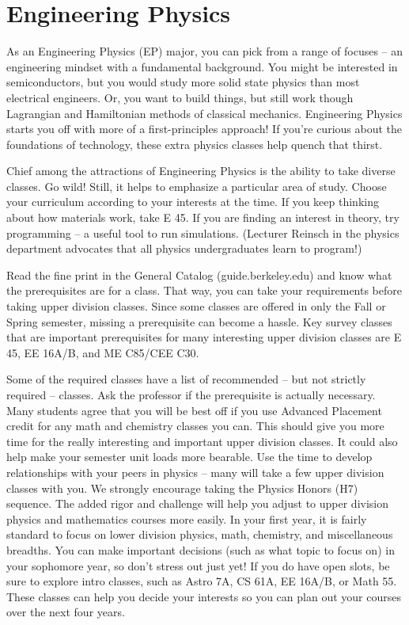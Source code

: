 \chapter*{Engineering Physics}

As an Engineering Physics (EP) major, you can pick from a range of focuses – an engineering mindset with a fundamental background. You might be interested in semiconductors, but you would study more solid state physics than most electrical engineers. Or, you want to build things, but still work though Lagrangian and Hamiltonian methods of classical mechanics. Engineering Physics starts you off with more of a first-principles approach! If you’re curious about the foundations of technology, these extra physics classes help quench that thirst.

Chief among the attractions of Engineering Physics is the ability to take diverse classes. Go wild! Still, it helps to emphasize a particular area of study. Choose your curriculum according to your interests at the time. If you keep thinking about how materials work, take E 45. If you are finding an interest in theory, try programming – a useful tool to run simulations. (Lecturer Reinsch in the physics department advocates that all physics undergraduates learn to program!)

Read the fine print in the General Catalog (guide.berkeley.edu) and know what the prerequisites are for a class. That way, you can take your requirements before taking upper division classes. Since some classes are offered in only the Fall or Spring semester, missing a prerequisite can become a hassle. Key survey classes that are important prerequisites for many interesting upper division classes are E 45, EE 16A/B, and ME C85/CEE C30.

Some of the required classes have a list of recommended – but not strictly required – classes. Ask the professor if the prerequisite is actually necessary. Many students agree that you will be best off if you use Advanced Placement credit for any math and chemistry classes you can. This should give you more time for the really interesting and important upper division classes. It could also help make your semester unit loads more bearable. Use the time to develop relationships with your peers in physics – many will take a few upper division classes with you. We strongly encourage taking the Physics Honors (H7) sequence. The added rigor and challenge will help you adjust to upper division physics and mathematics courses more easily.
In your first year, it is fairly standard to focus on lower division physics, math, chemistry, and miscellaneous breadths. You can make important decisions (such as what topic to focus on) in your sophomore year, so don't stress out just yet! If you do have open slots, be sure to explore intro classes, such as Astro 7A, CS 61A, EE 16A/B, or Math 55. These classes can help you decide your interests so you can plan out your courses over the next four years.

